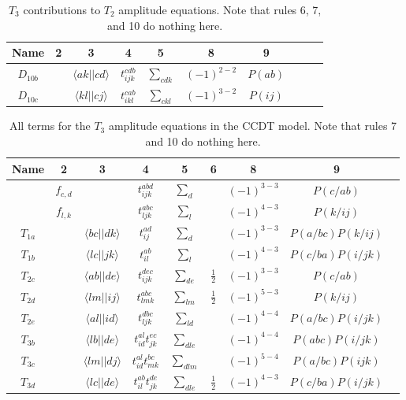\documentclass[10pt,twoside]{report}
\begin{document}
	\begin{table}[h]
		\centering
		\caption{$T_3$ contributions to $T_2$ amplitude equations. Note that rules 6, 7, and 10 do nothing here.}
		\begin{tabular}{cccccccccc}
			Name & 2 & 3 & 4 & 5 & 8 & 9 & \\ \hline
			$D_{10b}$ & & $\langle ak||cd \rangle$ & $t_{ijk}^{cdb}$ & $\sum_{cdk}$ & $(-1)^{2-2}$ & $P(ab)$ &\\
			$D_{10c}$ & & $\langle kl||cj \rangle$ & $t_{ikl}^{cab}$ & $\sum_{ckl}$ & $(-1)^{3-2}$ & $P(ij)$ &\\ \hline
		\end{tabular}
		\label{CC | table | "CCDT T2 amp eq derivation"}
	\end{table}
	
	\begin{table}[h]
		\centering
		\caption{All terms for the $T_3$ amplitude equations in the CCDT model. Note that rules 7 and 10 do nothing here.}
		\begin{tabular}{ccccccccc}
			Name & 2 & 3 & 4 & 5 & 6 & 8 & 9 & \\ \hline
			& $f_{c,d}$ & & $t_{ijk}^{abd}$ & $\sum_d$ & & $(-1)^{3-3}$ & $P(c/ab)$ & \\
			& $f_{l,k}$ & & $t_{ljk}^{abc}$ & $\sum_l$ & & $(-1)^{4-3}$ & $P(k/ij)$ & \\
			$T_{1a}$ & & $\langle bc||dk \rangle$ & $t_{ij}^{ad}$ & $\sum_{d}$ & & $(-1)^{3-3}$ & $P(a/bc)P(k/ij)$ &\\
			$T_{1b}$ & & $\langle lc||jk \rangle$ & $t_{il}^{ab}$ & $\sum_{l}$ & & $(-1)^{4-3}$ & $P(c/ba)P(i/jk)$ &\\
			$T_{2c}$ & & $\langle ab||de \rangle$ & $t_{ijk}^{dec}$ & $\sum_{de}$ & $\frac{1}{2}$ & $(-1)^{3-3}$ & $P(c/ab)$ &\\
			$T_{2d}$ & & $\langle lm||ij \rangle$ & $t_{lmk}^{abc}$ & $\sum_{lm}$ & $\frac{1}{2}$ & $(-1)^{5-3}$ & $P(k/ij)$ &\\
			$T_{2e}$ & & $\langle al||id \rangle$ & $t_{ljk}^{dbc}$ & $\sum_{ld}$ & & $(-1)^{4-4}$ & $P(a/bc)P(i/jk)$ &\\
			$T_{3b}$ & & $\langle lb||de \rangle$ & $t_{id}^{al}t_{jk}^{ec}$ & $\sum_{dle}$ & & $(-1)^{4-4}$ & $P(abc)P(i/jk)$ &\\
			$T_{3c}$ & & $\langle lm||dj \rangle$ & $t_{id}^{al}t_{mk}^{bc}$ & $\sum_{dlm}$ & & $(-1)^{5-4}$ & $P(a/bc)P(ijk)$ &\\
			$T_{3d}$ & & $\langle lc||de \rangle$ & $t_{il}^{ab}t_{jk}^{de}$ & $\sum_{dle}$ & $\frac{1}{2}$  & $(-1)^{4-3}$ & $P(c/ba)P(i/jk)$ &\\

\end{tabular}
\end{table}
\end{document}
